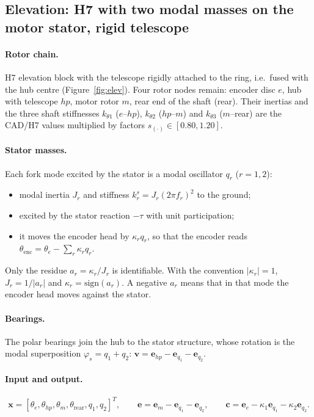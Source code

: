 \documentclass[10pt,a4paper]{article}
\numberwithin{equation}{section}
\begin{document}
\subsection{Elevation: H7 with two modal masses on the motor stator, rigid telescope}\label{sec:elev}
\paragraph{Rotor chain.} H7 elevation block with the telescope rigidly attached to the ring, i.e.\ fused with the hub centre (Figure~\ref{fig:elev}). Four rotor nodes remain: encoder disc $e$, hub with telescope $hp$, motor rotor $m$, rear end of the shaft (rear). Their inertias and the three shaft stiffnesses $k_{\theta1}$ ($e$--$hp$), $k_{\theta2}$ ($hp$--$m$) and $k_{\theta3}$ ($m$--rear) are the CAD/H7 values multiplied by factors $s_{(\cdot)}\in[0.80,1.20]$.

\paragraph{Stator masses.} Each fork mode excited by the stator is a modal oscillator $q_r$ ($r=1,2$):
\begin{itemize}
\item modal inertia $J_r$ and stiffness $k_r^s=J_r(2\pi f_r)^2$ to the ground;
\item excited by the stator reaction $-\tau$ with unit participation;
\item it moves the encoder head by $\kappa_rq_r$, so that the encoder reads $\theta_\mathrm{enc}=\theta_e-\sum_r\kappa_rq_r$.
\end{itemize}
Only the residue $a_r=\kappa_r/J_r$ is identifiable. With the convention $|\kappa_r|=1$, $J_r=1/|a_r|$ and $\kappa_r=\mathrm{sign}(a_r)$. A negative $a_r$ means that in that mode the encoder head moves against the stator.

\paragraph{Bearings.} The polar bearings join the hub to the stator structure, whose rotation is the modal superposition $\varphi_s=q_1+q_2$: $\mathbf v=\mathbf e_{hp}-\mathbf e_{q_1}-\mathbf e_{q_2}$.

\paragraph{Input and output.}
\begin{equation}
\mathbf x=[\theta_e,\theta_{hp},\theta_m,\theta_\mathrm{rear},q_1,q_2]^T,\qquad \mathbf e=\mathbf e_m-\mathbf e_{q_1}-\mathbf e_{q_2},\qquad \mathbf c=\mathbf e_e-\kappa_1\mathbf e_{q_1}-\kappa_2\mathbf e_{q_2} .
\end{equation}
\end{document}
